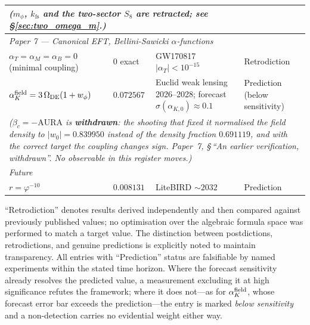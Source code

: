 \documentclass[12pt,a4paper]{article}
\begin{document}
\begin{table}[ht]
{\begin{tabular}{llll}
\multicolumn{4}{l}{\quad\footnotesize\textit{($m_\phi$, $k_{\mathrm{fs}}$ and the two-sector $S_8$ are retracted; see \S\ref{sec:two_omega_m}.)}} \\
\midrule
\multicolumn{4}{l}{\textit{Paper 7 — Canonical EFT, Bellini-Sawicki $\alpha$-functions}} \\
$\alpha_T=\alpha_M=\alpha_B=0$ (minimal coupling) & $0$ exact & GW170817 $|\alpha_T|<10^{-15}$ & Retrodiction \\
$\alpha_K^{\rm field} = 3\,\Omega_{\mathrm{DE}}(1+w_\phi)$ & $0.072567$ & Euclid weak lensing 2026--2028; forecast $\sigma(\alpha_{K,0})\!\approx\!0.1$ & Prediction (below sensitivity) \\
\multicolumn{4}{l}{\quad\footnotesize\textit{($\beta_c=-\mathrm{AURA}$ is \textbf{withdrawn}: the shooting that fixed it normalised the field density to $|w_0|=0.839950$ instead of the density fraction $0.691119$, and with the correct target the coupling changes sign. Paper~7, \S\,``An earlier verification, withdrawn''. No observable in this register moves.)}} \\
\midrule
\multicolumn{4}{l}{\textit{Future}} \\
$r = \varphi^{-10}$ & $0.008131$ & LiteBIRD ${\sim}2032$ & Prediction \\
\bottomrule
\end{tabular}%
}
\end{table}

``Retrodiction'' denotes results derived independently and then compared against
previously published values; no optimisation over the algebraic formula space
was performed to match a target value.  The distinction between postdictions,
retrodictions, and genuine predictions is explicitly noted to maintain transparency.
All entries with ``Prediction'' status are falsifiable by named experiments within
the stated time horizon. Where the forecast sensitivity already resolves the
predicted value, a measurement excluding it at high significance refutes the
framework; where it does not---as for $\alpha_K^{\rm field}$, whose forecast error
bar exceeds the prediction---the entry is marked \emph{below sensitivity} and a
non-detection carries no evidential weight either way.
\end{document}

